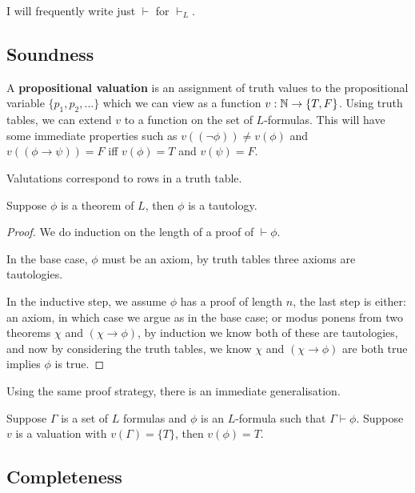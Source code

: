 \documentclass{article}
\begin{document}
I will frequently write just $\vdash$ for $\vdash_L$.

\subsection{Soundness}

\begin{definition}
    A \textbf{propositional valuation} is an assignment of truth values to the propositional variable $\{p_1,p_2,\ldots\}$ which we can view as a function $v:\mathbb{N}\rightarrow\{T,F\}$. Using truth tables, we can extend $v$ to a function on the set of $L$-formulas. This will have some immediate properties such as $v((\neg\phi))\neq v(\phi)$ and $v((\phi\rightarrow\psi))=F$ iff $v(\phi)=T$ and $v(\psi)=F$.
\end{definition}

Valutations correspond to rows in a truth table.

\begin{theorem}[Soundness of $L$]
    Suppose $\phi$ is a theorem of $L$, then $\phi$ is a tautology.
    \begin{proof}
        We do induction on the length of a proof of $\vdash\phi$.

        In the base case, $\phi$ must be an axiom, by truth tables three axioms are tautologies.

        In the inductive step, we assume $\phi$ has a proof of length $n$, the last step is either: an axiom, in which case we argue as in the base case; or modus ponens from two theorems $\chi$ and $(\chi\rightarrow\phi)$, by induction we know both of these are tautologies, and now by considering the truth tables, we know $\chi$ and $(\chi\rightarrow\phi)$ are both true implies $\phi$ is true.
    \end{proof}
\end{theorem}

Using the same proof strategy, there is an immediate generalisation.

\begin{corollary}
    Suppose $\Gamma$ is a set of $L$ formulas and $\phi$ is an $L$-formula such that $\Gamma\vdash\phi$. Suppose $v$ is a valuation with $v(\Gamma)=\{T\}$, then $v(\phi)=T$.
\end{corollary}

\subsection{Completeness}
\end{document}
